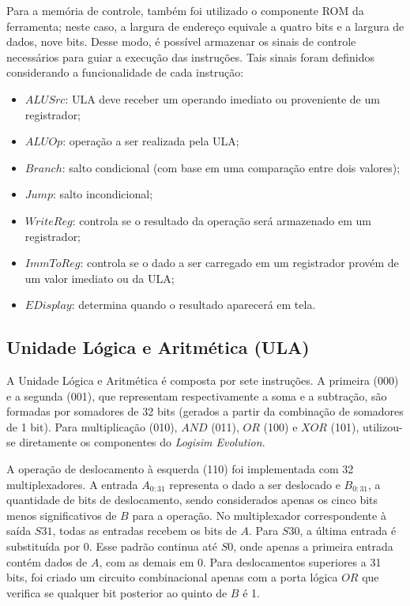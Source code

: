 \documentclass[twocolumn, 11pt]{article}
\begin{document}
Para a memória de controle, também foi utilizado o componente ROM da ferramenta; neste caso, a largura de endereço equivale a quatro bits e a largura de dados, nove bits. Desse modo, é possível armazenar os sinais de controle necessários para guiar a execução das instruções. Tais sinais foram definidos considerando a funcionalidade de cada instrução:

\begin{itemize}
  \item $ALUSrc$: ULA deve receber um operando imediato ou proveniente de um registrador; 
  \item $ALUOp$: operação a ser realizada pela ULA;
  \item $Branch$: salto condicional (com base em uma comparação entre dois valores);
  \item $Jump$: salto incondicional;
  \item $WriteReg$: controla se o resultado da operação será armazenado em um registrador;
  \item $ImmToReg$: controla se o dado a ser carregado em um registrador provém de um valor imediato ou da ULA;
  \item $EDisplay$: determina quando o resultado aparecerá em tela.
\end{itemize}

\subsection{Unidade Lógica e Aritmética (ULA)}

A Unidade Lógica e Aritmética é composta por sete instruções. A primeira (000) e a segunda (001), que representam respectivamente a soma e a subtração, são formadas por somadores de 32 bits (gerados a partir da combinação de somadores de 1 bit). Para multiplicação (010), $AND$ (011), $OR$ (100) e $XOR$ (101), utilizou-se diretamente os componentes do \textit{Logisim Evolution}. 

A operação de deslocamento à esquerda (110) foi implementada com 32 multiplexadores. A entrada $A_{0:31}$ representa o dado a ser deslocado e $B_{0:31}$, a quantidade de bits de deslocamento, sendo considerados apenas os cinco bits menos significativos de $B$ para a operação. No multiplexador correspondente à saída $S31$, todas as entradas recebem os bits de $A$. Para $S30$, a última entrada é substituída por 0. Esse padrão continua até $S0$, onde apenas a primeira entrada contém dados de $A$, com as demais em 0. Para deslocamentos superiores a 31 bits, foi criado um circuito combinacional apenas com a porta lógica $OR$ que verifica se qualquer bit posterior ao quinto de $B$ é 1.
\end{document}
